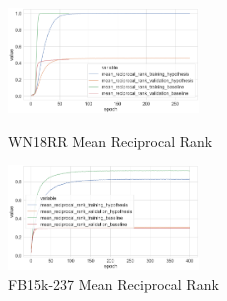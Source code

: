 
\begin{figure}[H]
	\parbox{.5\linewidth}{
   		\centering
    		\includegraphics[width=0.45\textwidth, height=0.2\textheight]{WN18RR_mean_reciprocal_rank_Results}
		\caption{WN18RR Mean Reciprocal Rank}
		}
	\hfill
	\parbox{.5\linewidth}{
   		\centering
		\includegraphics[width=0.45\textwidth, height=0.2\textheight]{FB15k-237_mean_reciprocal_rank_Results}
		\caption{FB15k-237 Mean Reciprocal Rank}
		}
\end{figure}



